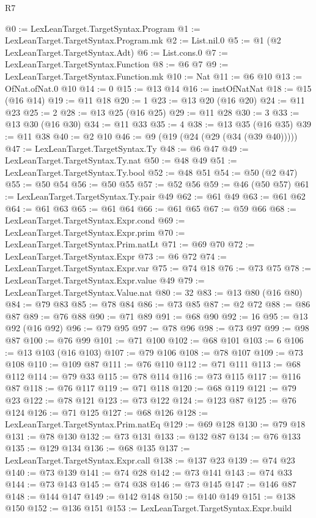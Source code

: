 \begin{lexlean}{R7}
\begin{coremodule}
@0 := LexLeanTarget.TargetSyntax.Program
@1 := LexLeanTarget.TargetSyntax.Program.mk
@2 := List.nil.{0}
@5 := @1 (@2 LexLeanTarget.TargetSyntax.Adt)
@6 := List.cons.{0}
@7 := LexLeanTarget.TargetSyntax.Function
@8 := @6 @7
@9 := LexLeanTarget.TargetSyntax.Function.mk
@10 := Nat
@11 := @6 @10
@13 := OfNat.ofNat.{0} @10
@14 := 0
@15 := @13 @14
@16 := instOfNatNat
@18 := @15 (@16 @14)
@19 := @11 @18
@20 := 1
@23 := @13 @20 (@16 @20)
@24 := @11 @23
@25 := 2
@28 := @13 @25 (@16 @25)
@29 := @11 @28
@30 := 3
@33 := @13 @30 (@16 @30)
@34 := @11 @33
@35 := 4
@38 := @13 @35 (@16 @35)
@39 := @11 @38
@40 := @2 @10
@46 := @9 (@19 (@24 (@29 (@34 (@39 @40)))))
@47 := LexLeanTarget.TargetSyntax.Ty
@48 := @6 @47
@49 := LexLeanTarget.TargetSyntax.Ty.nat
@50 := @48 @49
@51 := LexLeanTarget.TargetSyntax.Ty.bool
@52 := @48 @51
@54 := @50 (@2 @47)
@55 := @50 @54
@56 := @50 @55
@57 := @52 @56
@59 := @46 (@50 @57)
@61 := LexLeanTarget.TargetSyntax.Ty.pair @49
@62 := @61 @49
@63 := @61 @62
@64 := @61 @63
@65 := @61 @64
@66 := @61 @65
@67 := @59 @66
@68 := LexLeanTarget.TargetSyntax.Expr.cond
@69 := LexLeanTarget.TargetSyntax.Expr.prim
@70 := LexLeanTarget.TargetSyntax.Prim.natLt
@71 := @69 @70
@72 := LexLeanTarget.TargetSyntax.Expr
@73 := @6 @72
@74 := LexLeanTarget.TargetSyntax.Expr.var
@75 := @74 @18
@76 := @73 @75
@78 := LexLeanTarget.TargetSyntax.Expr.value @49
@79 := LexLeanTarget.TargetSyntax.Value.nat
@80 := 32
@83 := @13 @80 (@16 @80)
@84 := @79 @83
@85 := @78 @84
@86 := @73 @85
@87 := @2 @72
@88 := @86 @87
@89 := @76 @88
@90 := @71 @89
@91 := @68 @90
@92 := 16
@95 := @13 @92 (@16 @92)
@96 := @79 @95
@97 := @78 @96
@98 := @73 @97
@99 := @98 @87
@100 := @76 @99
@101 := @71 @100
@102 := @68 @101
@103 := 6
@106 := @13 @103 (@16 @103)
@107 := @79 @106
@108 := @78 @107
@109 := @73 @108
@110 := @109 @87
@111 := @76 @110
@112 := @71 @111
@113 := @68 @112
@114 := @79 @33
@115 := @78 @114
@116 := @73 @115
@117 := @116 @87
@118 := @76 @117
@119 := @71 @118
@120 := @68 @119
@121 := @79 @23
@122 := @78 @121
@123 := @73 @122
@124 := @123 @87
@125 := @76 @124
@126 := @71 @125
@127 := @68 @126
@128 := LexLeanTarget.TargetSyntax.Prim.natEq
@129 := @69 @128
@130 := @79 @18
@131 := @78 @130
@132 := @73 @131
@133 := @132 @87
@134 := @76 @133
@135 := @129 @134
@136 := @68 @135
@137 := LexLeanTarget.TargetSyntax.Expr.call
@138 := @137 @23
@139 := @74 @23
@140 := @73 @139
@141 := @74 @28
@142 := @73 @141
@143 := @74 @33
@144 := @73 @143
@145 := @74 @38
@146 := @73 @145
@147 := @146 @87
@148 := @144 @147
@149 := @142 @148
@150 := @140 @149
@151 := @138 @150
@152 := @136 @151
@153 := LexLeanTarget.TargetSyntax.Expr.build

\end{coremodule}
\end{lexlean}
